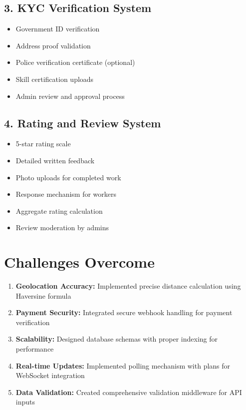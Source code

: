 \documentclass[12pt,a4paper]{article}
\begin{document}
\subsection*{3. KYC Verification System}
\begin{itemize}[leftmargin=*]
    \item Government ID verification
    \item Address proof validation
    \item Police verification certificate (optional)
    \item Skill certification uploads
    \item Admin review and approval process
\end{itemize}

\subsection*{4. Rating and Review System}
\begin{itemize}[leftmargin=*]
    \item 5-star rating scale
    \item Detailed written feedback
    \item Photo uploads for completed work
    \item Response mechanism for workers
    \item Aggregate rating calculation
    \item Review moderation by admins
\end{itemize}

\section*{Challenges Overcome}

\begin{enumerate}[leftmargin=*]
    \item \textbf{Geolocation Accuracy:} Implemented precise distance calculation using Haversine formula
    \item \textbf{Payment Security:} Integrated secure webhook handling for payment verification
    \item \textbf{Scalability:} Designed database schemas with proper indexing for performance
    \item \textbf{Real-time Updates:} Implemented polling mechanism with plans for WebSocket integration
    \item \textbf{Data Validation:} Created comprehensive validation middleware for API inputs
\end{enumerate}
\end{document}
